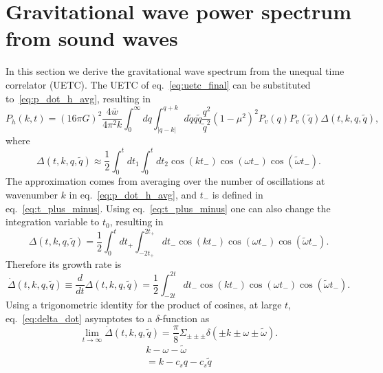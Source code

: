 \section{Gravitational wave power spectrum from sound waves}
\label{gw_from_sound_waves}
In this section we derive the gravitational wave spectrum from the unequal time correlator (UETC).
The UETC of eq.~\eqref{eq:uetc_final} can be substituted to~\eqref{eq:p_dot_h_avg},
resulting in
\cite[eq. 3.35]{hindmarsh_gw_pt_2019}
\begin{equation}
P_{\dot{h}} (k,t) = (16 \pi G)^2 \frac{4 \bar{w}}{4\pi^2 k}
\int_0^\infty dq \int_{|q-k|}^{q+k} d\tilde{q} q \tilde{q} \frac{q^2}{\tilde{q}^2} (1-\mu^2)^2
P_v(q) P_v(\tilde{q}) \Delta(t,k,q,\tilde{q}),
\end{equation}
where
\begin{equation}
\Delta(t,k,q,\tilde{q}) \approx \frac{1}{2} \int_0^t dt_1 \int_0^t dt_2 \cos(kt_-)\cos(\omega t_-)\cos(\tilde{\omega}t_-).
\end{equation}
The approximation comes from averaging over the number of oscillations at wavenumber $k$ in eq.~\eqref{eq:p_dot_h_avg},
and $t_-$ is defined in eq.~\eqref{eq:t_plus_minus}.
Using eq.~\eqref{eq:t_plus_minus} one can also change the integration variable to $t_0$, resulting in
\begin{equation}
\Delta(t,k,q,\tilde{q}) = \frac{1}{2} \int_0^t dt_+ \int_{-2t_+}^{2t_+} dt_- \cos(kt_-) \cos(\omega t_-) \cos(\tilde{\omega} t_-).
\end{equation}
Therefore its growth rate is
\begin{equation}
\dot{\Delta}(t,k,q,\tilde{q}) \equiv \frac{d}{dt} \Delta(t,k,q,\tilde{q}) = \frac{1}{2} \int_{-2t}^{2t} dt_- \cos(kt_-) \cos(\omega t_-) \cos(\tilde{\omega} t_-).
\label{eq:delta_dot}
\end{equation}
Using a trigonometric identity for the product of cosines,
at large $t$, eq.~\eqref{eq:delta_dot} asymptotes to a $\delta$-function as
\begin{equation}
\lim_{t\rightarrow\infty} \dot{\Delta}(t,k,q,\tilde{q}) = \frac{\pi}{8} \Sigma_{\pm\pm\pm} \delta(\pm k \pm \omega \pm \tilde{\omega}).
\end{equation}
\iffalse
\begin{align}
k - \omega - \tilde{\omega} \\
= k - c_s q - c_s \tilde{q} \\
\end{align}
